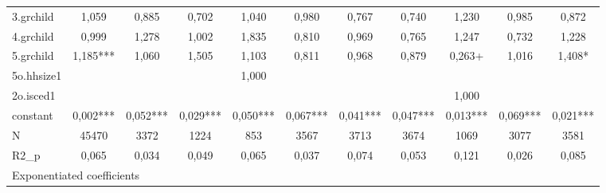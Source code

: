 {\begin{tabular}{l*{10}{c}}
3.grchild   &       1,059   &       0,885   &       0,702   &       1,040   &       0,980   &       0,767   &       0,740   &       1,230   &       0,985   &       0,872   \\
4.grchild   &       0,999   &       1,278   &       1,002   &       1,835   &       0,810   &       0,969   &       0,765   &       1,247   &       0,732   &       1,228   \\
5.grchild   &       1,185***&       1,060   &       1,505   &       1,103   &       0,811   &       0,968   &       0,879   &       0,263+  &       1,016   &       1,408*  \\
5o.hhsize1  &               &               &               &       1,000   &               &               &               &               &               &               \\
2o.isced1   &               &               &               &               &               &               &               &       1,000   &               &               \\
constant    &       0,002***&       0,052***&       0,029***&       0,050***&       0,067***&       0,041***&       0,047***&       0,013***&       0,069***&       0,021***\\
\hline
N           &       45470   &        3372   &        1224   &         853   &        3567   &        3713   &        3674   &        1069   &        3077   &        3581   \\
R2\_p        &       0,065   &       0,034   &       0,049   &       0,065   &       0,037   &       0,074   &       0,053   &       0,121   &       0,026   &       0,085   \\
\hline\hline
\multicolumn{11}{l}{\footnotesize Exponentiated coefficients}\\
\end{tabular}
}
